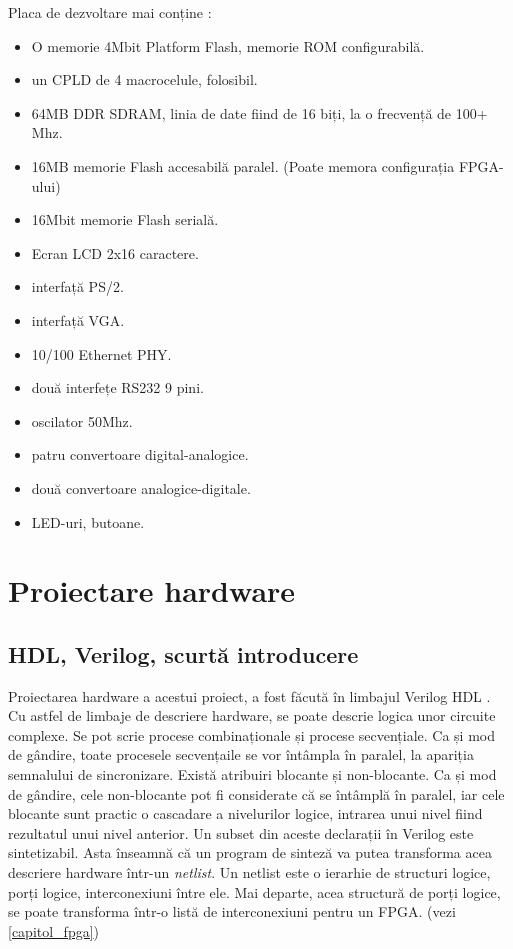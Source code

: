 \documentclass[12pt,twoside,a4paper,fleqn]{book}
\theoremstyle{definition}
\begin{document}
Placa de dezvoltare mai conține \cite{spartan_starter_kit}:
\begin{itemize}
\item O memorie 4Mbit Platform Flash, memorie ROM configurabilă.
\item un CPLD de 4 macrocelule, folosibil.
\item 64MB DDR SDRAM, linia de date fiind de 16 biți, la o frecvență de 100+ Mhz.
\item 16MB memorie Flash accesabilă paralel. (Poate memora configurația FPGA-ului)
\item 16Mbit memorie Flash serială.
\item Ecran LCD 2x16 caractere.
\item interfață PS/2.
\item interfață VGA.
\item 10/100 Ethernet PHY.
\item două interfețe RS232 9 pini.
\item oscilator 50Mhz.
\item patru convertoare digital-analogice.
\item două convertoare analogice-digitale.
\item LED-uri, butoane.
\end{itemize}


\chapter{Proiectare hardware}

\section{HDL, Verilog, scurtă introducere}
Proiectarea hardware a acestui proiect, a fost făcută în limbajul Verilog HDL \cite{peter_verilog}. Cu astfel de limbaje de descriere hardware, se poate descrie logica unor circuite complexe. Se pot scrie procese combinaționale și procese secvențiale. Ca și mod de gândire, toate procesele secvențaile se vor întâmpla în paralel, la apariția semnalului de sincronizare. Există atribuiri blocante și non-blocante. Ca și mod de gândire, cele non-blocante pot fi considerate că se întâmplă în paralel, iar cele blocante sunt practic o cascadare a nivelurilor logice, intrarea unui nivel fiind rezultatul unui nivel anterior. Un subset din aceste declarații în Verilog este sintetizabil. Asta înseamnă că un program de sinteză va putea transforma acea descriere hardware într-un \emph{netlist}. Un netlist este o ierarhie de structuri logice, porți logice, interconexiuni între ele. Mai departe, acea structură de porți logice, se poate transforma într-o listă de interconexiuni pentru un FPGA. (vezi \ref{capitol_fpga})\\
\end{document}
